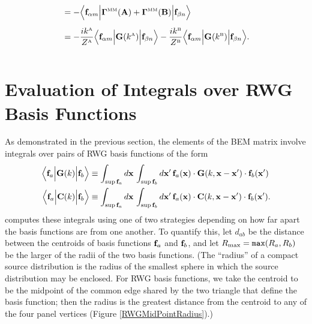 \documentclass[dvips,letterpaper]{article}
\newcommand{\BG}{\boldsymbol{\Gamma}}
\begin{document}
\begin{enumerate}
\begin{align*}
 &= -\Big\langle \vb f_{\alpha m} 
    \Big| \BG\supt{MM}(\vb A) + \BG\supt{MM}(\vb B) \Big|
                \vb f_{\beta n} 
    \Big\rangle
\\[5pt]
 &= -\frac{ik\supt{A}}{Z\supt{A}}
    \Big\langle \vb f_{\alpha m} 
                 \Big| \vb G(k\supt{A}) \Big|
                 \vb f_{\beta n} 
    \Big\rangle
    -
    \frac{ik\supt{B}}{Z\supt{B}}
    \Big\langle \vb f_{\alpha m} 
                 \Big| \vb G(k\supt{B}) \Big|
                 \vb f_{\beta n}
    \Big\rangle.
\\[10pt]
\end{align*}
\end{enumerate}

\newpage
\section{Evaluation of Integrals over RWG Basis Functions}

As demonstrated in the previous section, the elements of the 
BEM matrix involve integrals over pairs of RWG basis functions 
of the form
\begin{subequations}
\begin{align}
 \Big\langle \mathbf{f}_a \Big| \mathbf{G}(k) \Big | \mathbf{f}_b \Big \rangle
&\equiv 
  \int_{\sup \mathbf{f}_a} d\mathbf{x} \, 
  \int_{\sup \mathbf{f}_b} d\mathbf{x}^\prime \,
  \mathbf{f}_a(\mathbf{x}) \cdot 
  \mathbf{G}(k, \mathbf{x}-\mathbf{x}^\prime) \cdot 
  \mathbf{f}_b(\mathbf{x}^\prime)
\\
 \Big\langle \mathbf{f}_a \Big| \mathbf{C}(k) \Big | \mathbf{f}_b \Big \rangle
&\equiv 
  \int_{\sup \mathbf{f}_a} d\mathbf{x} \, 
  \int_{\sup \mathbf{f}_b} d\mathbf{x}^\prime \,
  \mathbf{f}_a(\mathbf{x}) \cdot 
  \mathbf{C}(k, \mathbf{x}-\mathbf{x}^\prime) \cdot 
  \mathbf{f}_b(\mathbf{x}^\prime).
\end{align}
\label{MatrixElementIntegrals}
\end{subequations}
\lss computes these integrals using one of two strategies depending
on how far apart the basis functions are from one another. To 
quantify this, let $d_{ab}$ be the distance between the centroids
of basis functions $\mathbf{f}_a$ and $\mathbf{f}_b$, and let 
$R_{\hbox{\scriptsize{max}}}=\texttt{max}(R_a, R_b)$ be the larger of the radii
of the two basis functions. (The ``radius'' of a compact source distribution
is the radius of the smallest sphere in which the source distribution
may be enclosed. For RWG basis functions, we take the centroid to be
the midpoint of the common edge shared by the two triangle that define
the basis function; then the radius is the greatest distance from the 
centroid to any of the four panel vertices 
(Figure \ref{RWGMidPointRadius}).) 
\end{document}
